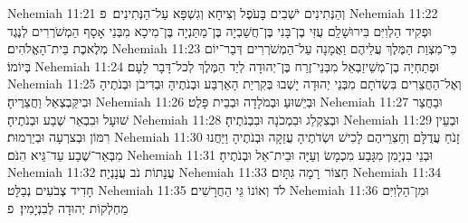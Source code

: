 Nehemiah 11:21	וְהַנְּתִינִים יֹשְׁבִים בָּעֹפֶל וְצִיחָא וְגִשְׁפָּא עַל־הַנְּתִינִים׃ {פ}
Nehemiah 11:22	וּפְקִיד הַלְוִיִּם בִּירוּשָׁלַ͏ִם עֻזִּי בֶן־בָּנִי בֶּן־חֲשַׁבְיָה בֶּן־מַתַּנְיָה בֶּן־מִיכָא מִבְּנֵי אָסָף הַמְשֹׁרְרִים לְנֶגֶד מְלֶאכֶת בֵּית־הָאֱלֹהִים׃
Nehemiah 11:23	כִּי־מִצְוַת הַמֶּלֶךְ עֲלֵיהֶם וַאֲמָנָה עַל־הַמְשֹׁרְרִים דְּבַר־יוֹם בְּיוֹמוֹ׃
Nehemiah 11:24	וּפְתַחְיָה בֶן־מְשֵׁיזַבְאֵל מִבְּנֵי־זֶרַח בֶּן־יְהוּדָה לְיַד הַמֶּלֶךְ לְכל־דָּבָר לָעָם׃
Nehemiah 11:25	וְאֶל־הַחֲצֵרִים בִּשְׂדֹתָם מִבְּנֵי יְהוּדָה יָשְׁבוּ בְּקִרְיַת הָאַרְבַּע וּבְנֹתֶיהָ וּבְדִיבֹן וּבְנֹתֶיהָ וּבִיקַּבְצְאֵל וַחֲצֵרֶיהָ׃
Nehemiah 11:26	וּבְיֵשׁוּעַ וּבְמֹלָדָה וּבְבֵית פָּלֶט׃
Nehemiah 11:27	וּבַחֲצַר שׁוּעָל וּבִבְאֵר שֶׁבַע וּבְנֹתֶיהָ׃
Nehemiah 11:28	וּבְצִקְלַג וּבִמְכֹנָה וּבִבְנֹתֶיהָ׃
Nehemiah 11:29	וּבְעֵין רִמּוֹן וּבְצרְעָה וּבְיַרְמוּת׃
Nehemiah 11:30	זָנֹחַ עֲדֻלָּם וְחַצְרֵיהֶם לָכִישׁ וּשְׂדֹתֶיהָ עֲזֵקָה וּבְנֹתֶיהָ וַיַּחֲנוּ מִבְּאֵר־שֶׁבַע עַד־גֵּיא הִנֹּם׃
Nehemiah 11:31	וּבְנֵי בִנְיָמִן מִגָּבַע מִכְמָשׂ וְעַיָּה וּבֵית־אֵל וּבְנֹתֶיהָ׃
Nehemiah 11:32	עֲנָתוֹת נֹב עֲנָנְיָה׃
Nehemiah 11:33	חָצוֹר  רָמָה גִּתָּיִם׃
Nehemiah 11:34	חָדִיד צְבֹעִים נְבַלָּט׃
Nehemiah 11:35	לֹד וְאוֹנוֹ גֵּי הַחֲרָשִׁים׃
Nehemiah 11:36	וּמִן־הַלְוִיִּם מַחְלְקוֹת יְהוּדָה לְבִנְיָמִין׃ {פ}

